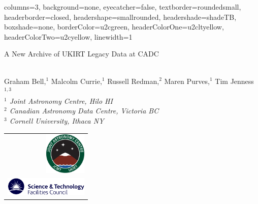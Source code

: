 \documentclass[a0paper,portrait]{baposter}
\begin{document}
\begin{poster}{
    columns=3,
    background=none,
    eyecatcher=false,
    textborder=roundedsmall,
    headerborder=closed,
    headershape=smallrounded,
    headershade=shadeTB,
    boxshade=none,
    borderColor=u2cgreen,
    headerColorOne=u2cltyellow,
    headerColorTwo=u2cyellow,
    linewidth=1
}{

}{\raggedright \smaller
A New Archive of UKIRT Legacy Data at CADC
}{
\vspace{0.1cm} \\
Graham Bell,$^1$ Malcolm Currie,$^1$ Russell Redman,$^2$ Maren Purves,$^1$ Tim Jenness$^{1,3}$
\vspace{0.1cm} \\
\smaller[2]
\textsl{$^1$ Joint Astronomy Centre, Hilo HI} \\
\textsl{$^2$ Canadian Astronomy Data Centre, Victoria BC} \\
\textsl{$^3$ Cornell University, Ithaca NY}
}{
\begin{tabular}{r}
\includegraphics[width=2cm]{jaclogo} \\
\includegraphics[width=4cm]{stfclogo}
\end{tabular}
}

\end{poster}
\end{document}

